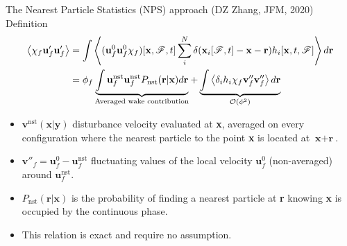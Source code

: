 \documentclass{sintefbeamer}
\begin{document}
\begin{frame}{The Nearest Particle Statistics (NPS) approach (DZ Zhang, JFM, 2020) Definition}
  \begin{align*}
    \left<\chi_f \textbf{u}_f'\textbf{u}_f'\right>
    &=
    \int 
    \left<(\textbf{u}_f^0\textbf{u}_f^0\chi_f)[\textbf{x},\mathscr{F},t]\sum_i^N \delta(\textbf{x}_i[\mathscr{F},t] - \textbf{x} - \textbf{r}) h_i[\textbf{x},t,\mathscr{F}]\right> 
    d\textbf{r} \\
    &=\phi_f
    \underbrace{\int 
      \textbf{u}^\text{nst}_f
      \textbf{u}^\text{nst}_f 
      P_\text{nst}(\textbf{r}|\textbf{x}) d\textbf{r} 
    }_\text{Averaged wake contribution}
    + \underbrace{ 
      \int \left<\delta_i h_i \chi_f \textbf{v}_f''\textbf{v}_f''\right>  d\textbf{r}
    }_{\mathcal{O}(\phi^2)}
  \end{align*}

  \begin{itemize}
    \item $\textbf{v}^\text{nst}(\textbf{x}|\textbf{y})$ disturbance velocity evaluated at \textbf{x}, averaged on every configuration where the nearest particle to the point \textbf{x} is located at $\textbf{x} + \textbf{r}$. 
    \item $\textbf{v}''_f = \textbf{u}^0_f - \textbf{u}^\text{nst}_f$ fluctuating values of the local velocity $\textbf{u}_f^0$ (non-averaged) around $\textbf{u}_f^\text{nst}$.
    \item $P_\text{nst}(\textbf{r}|\textbf{x})$ is the probability of finding a nearest particle at \textbf{r} knowing \textbf{x} is occupied by the continuous phase.   
    \item This relation is exact and require no assumption. 
  \end{itemize}
\end{frame}
\end{document}
